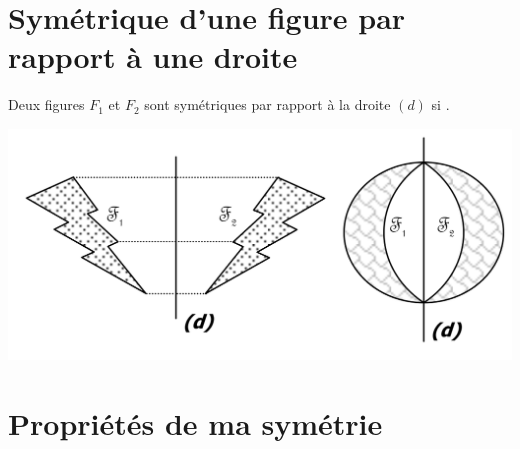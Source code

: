 \documentclass[12pt,a4paper]{article}
\begin{document}
\section{Symétrique  d'une figure par rapport à une droite}

	\begin{mydef}
		Deux figures $F_1$ et $F_2$ sont symétriques par rapport à la droite $(d)$ si .
		
		
		\begin{center}
			\includegraphics[scale=0.35]{def}
		\end{center}
	\end{mydef}

\section{Propriétés de ma symétrie}
\end{document}
